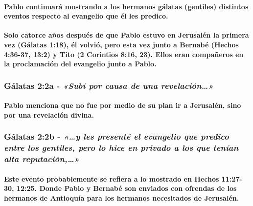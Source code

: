 \documentclass[11a pt,twoside]{article}
\newcommand{\scripture}[1]{%
  {\fontsize{12pt}{16pt}\selectfont\ScriptureFont\itshape #1}%
}
\let\oldsubsubsection\subsubsection
\renewcommand{\subsubsection}{\needspace{4\baselineskip}\oldsubsubsection}
\let\oldparagraph\paragraph
\renewcommand{\paragraph}{\needspace{3\baselineskip}\oldparagraph}
\begin{document}
\paragraph{Pablo continuará mostrando a los hermanos gálatas (gentiles)
distintos eventos respecto al evangelio que él les
predico.}\label{pablo-continuaruxe1-mostrando-a-los-hermanos-guxe1latas-gentiles-distintos-eventos-respecto-al-evangelio-que-uxe9l-les-predico.}

\paragraph{Solo catorce años después de que Pablo estuvo en Jerusalén la
primera vez (Gálatas 1:18), él volvió, pero esta vez junto a Bernabé
(Hechos 4:36-37, 13:2) y Tito (2 Corintios 8:16, 23). Ellos eran
compañeros en la proclamación del evangelio junto a
Pablo.}\label{solo-catorce-auxf1os-despuuxe9s-de-que-pablo-estuvo-en-jerusaluxe9n-la-primera-vez-guxe1latas-118-uxe9l-volviuxf3-pero-esta-vez-junto-a-bernabuxe9-hechos-436-37-132-y-tito-2-corintios-816-23.-ellos-eran-compauxf1eros-en-la-proclamaciuxf3n-del-evangelio-junto-a-pablo.}

\subsubsection{\texorpdfstring{Gálatas 2:2a -
\scripture{«Subí por causa de una revelación…»}}{Gálatas 2:2a - }}\label{guxe1latas-22a---subuxed-por-causa-de-una-revelaciuxf3n}

\paragraph{Pablo menciona que no fue por medio de su plan ir a
Jerusalén, sino por una revelación
divina.}\label{pablo-menciona-que-no-fue-por-medio-de-su-plan-ir-a-jerusaluxe9n-sino-por-una-revelaciuxf3n-divina.}

\subsubsection{\texorpdfstring{Gálatas 2:2b -
\scripture{«…y les presenté el evangelio que predico entre los gentiles, pero lo hice en privado a los que tenían alta reputación,…»}}{Gálatas 2:2b - }}\label{guxe1latas-22b---y-les-presentuxe9-el-evangelio-que-predico-entre-los-gentiles-pero-lo-hice-en-privado-a-los-que-tenuxedan-alta-reputaciuxf3n}

\paragraph{Este evento probablemente se refiera a lo mostrado en Hechos
11:27-30, 12:25. Donde Pablo y Bernabé son enviados con ofrendas de los
hermanos de Antioquía para los hermanos necesitados de
Jerusalén.}\label{este-evento-probablemente-se-refiera-a-lo-mostrado-en-hechos-1127-30-1225.-donde-pablo-y-bernabuxe9-son-enviados-con-ofrendas-de-los-hermanos-de-antioquuxeda-para-los-hermanos-necesitados-de-jerusaluxe9n.}
\end{document}

